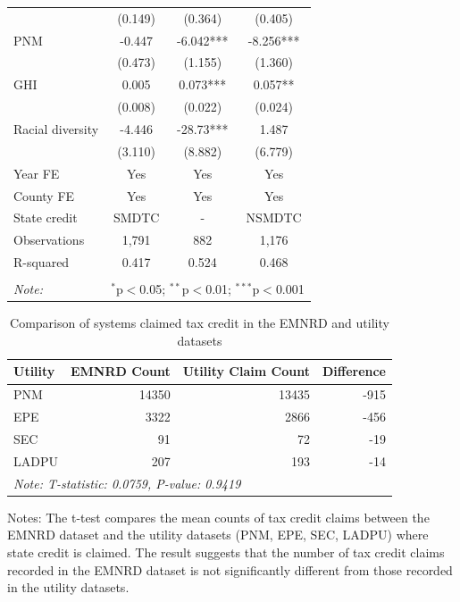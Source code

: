 \documentclass[12pt,twoside,letterpaper]{article}
\begin{document}
\begin{table}[H]
{\begin{tabular}{lccc}
 & (0.149) & (0.364) & (0.405) \\
PNM & -0.447 & -6.042*** & -8.256*** \\
 & (0.473) & (1.155) & (1.360) \\
GHI & 0.005 & 0.073*** & 0.057** \\
 & (0.008) & (0.022) & (0.024) \\
Racial diversity & -4.446 & -28.73*** & 1.487 \\
 & (3.110) & (8.882) & (6.779) \\ \cline{1-4}
Year FE & Yes & Yes & Yes \\
County FE & Yes & Yes & Yes \\
State credit & SMDTC & - & NSMDTC \\
Observations & 1,791 & 882 & 1,176 \\
R-squared & 0.417 & 0.524 & 0.468 \\ 
\hline
\hline \\[-1.8ex]
\textit{Note:} & \multicolumn{3}{r}{$^{*}$p$<$0.05; $^{**}$p$<$0.01; $^{***}$p$<$0.001} \\
\end{tabular}}
\end{table}



\begin{table}[H] 
\caption{Comparison of systems claimed tax credit in the EMNRD and utility datasets}
\label{tab:compare_emnrd_utility}
\centering
\begin{tabular}{lrrr}
\toprule
Utility & EMNRD Count & Utility Claim Count & Difference \\
\midrule
PNM & 14350 & 13435 & -915 \\
EPE & 3322 & 2866 & -456 \\
SEC & 91 & 72 & -19 \\
LADPU & 207 & 193 & -14 \\
\bottomrule
\multicolumn{4}{l}{\textit{Note:  T-statistic: 0.0759, P-value: 0.9419}} \\
\end{tabular}


\begin{flushleft}\footnotesize{Notes: The t-test compares the mean counts of tax credit claims between the EMNRD dataset and the utility datasets (PNM, EPE, SEC, LADPU) where state credit is claimed. The result suggests that the number of tax credit claims recorded in the EMNRD dataset is not significantly different from those recorded in the utility datasets.}
\end{flushleft}
\end{table}
\end{document}
